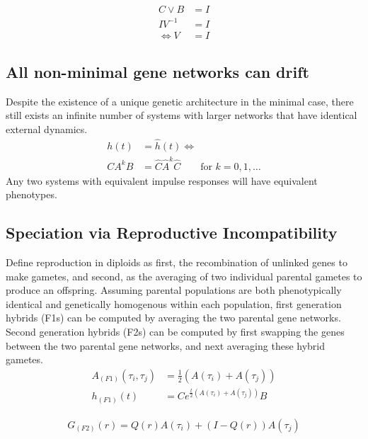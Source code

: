 \documentclass[9 pt]{article}
\newcommand{\1}{\mathbbm{1}}
\begin{document}
\begin{multicols}{2}
     \begin{align}
        C \lor B &= I \\
        IV^{-1} &= I \\
        \iff V &= I
      \end{align}

      \subsection*{All non-minimal gene networks can drift}
      
      Despite the existence of a unique genetic architecture in the minimal case, there still exists an infinite number of systems with larger networks that have identical external dynamics. 
      \begin{align}
        h(t) &= \widehat{h}(t) \iff \\ 
        CA^{k}B &= \widehat{C} \widehat{A}^{k} \widehat{C} \qquad \text{for } k = 0, 1, \dots
      \end{align}
      Any two systems with equivalent impulse responses will have equivalent phenotypes.

      \subsection*{Speciation via Reproductive Incompatibility}

      Define reproduction in diploids as first, the recombination of unlinked genes to make gametes, and second, as the averaging of two individual parental gametes to produce an offspring. Assuming parental populations are both phenotypically identical and genetically homogenous within each population, first generation hybrids (F1s) can be computed by averaging the two parental gene networks. Second generation hybrids (F2s) can be computed by first swapping the genes between the two parental gene networks, and next averaging these hybrid gametes.
      \begin{align*}
        A_{(F1)}(\tau_{i}, \tau_{j}) &= \frac{1}{2}\left(A(\tau_{i}) + A(\tau_{j}) \right) \\
        h_{(F1)}(t) &= C e^{\frac{t}{2}\left(A(\tau_{i}) + A(\tau_{j}) \right)} B
      \end{align*}

      \begin{align*}
        G_{(F2)}(r) = Q(r)A(\tau_{i}) + \left( I-Q(r) \right)A(\tau_{j})
      \end{align*}


\end{multicols}
\end{document}
